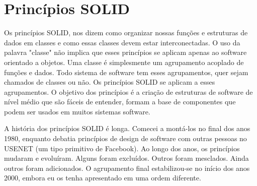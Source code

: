 \documentclass[12pt, %
openright, 
oneside, %
a4paper,    %
brazil]{facom-ufu-abntex2}
\begin{document}
\section{Princípios SOLID}

Os princípios SOLID, nos dizem como organizar nossas funções e estruturas de
dados em classes e como essas classes devem estar interconectadas. O uso da
palavra "classe" não implica que esses princípios se aplicam apenas ao software
orientado a objetos. Uma classe é simplesmente um agrupamento acoplado de
funções e dados. Todo sistema de software tem esses agrupamentos, quer sejam
chamados de classes ou não. Os princípios SOLID se aplicam a esses
agrupamentos. O objetivo dos princípios é a criação de estruturas de software
de nível médio que são fáceis de entender, formam a base de componentes que
podem ser usados em muitos sistemas software.

A história dos princípios SOLID é longa. Comecei a montá-los no final dos anos
1980, enquanto debatia princípios de design de software com outras pessoas no
USENET (um tipo primitivo de Facebook). Ao longo dos anos, os princípios
mudaram e evoluíram. Alguns foram excluídos. Outros foram mesclados. Ainda
outros foram adicionados. O agrupamento final estabilizou-se no início dos anos
2000, embora eu os tenha apresentado em uma ordem diferente.
\end{document}
